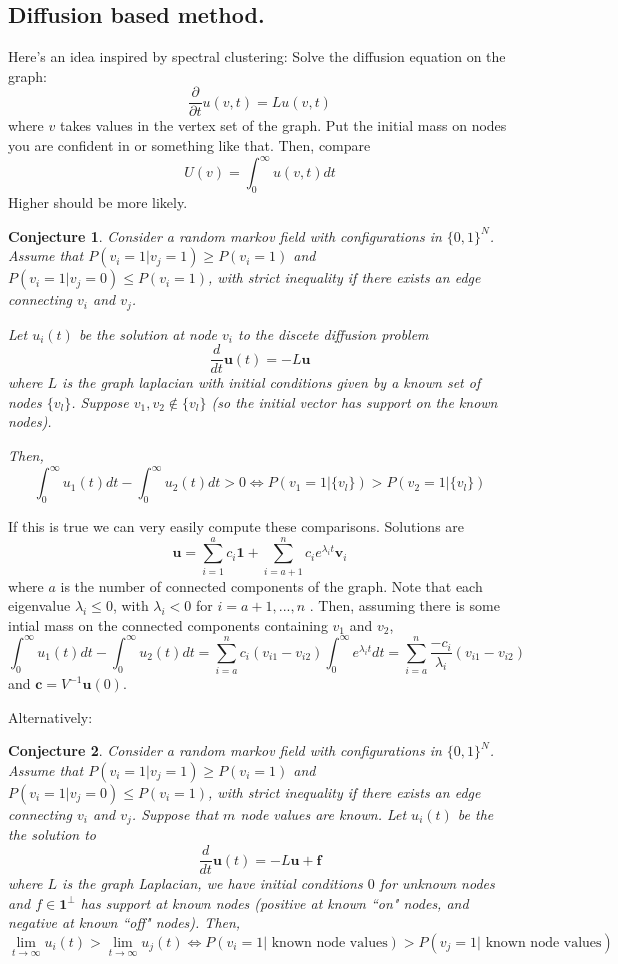 \documentclass[10pt]{article}
\newtheorem{conj}{Conjecture}
\theoremstyle{definition}
\numberwithin{theorem}{section}
\numberwithin{definition}{section}
\numberwithin{lemma}{section}
\numberwithin{corollary}{section}
\numberwithin{clm}{section}
\numberwithin{rmk}{section}
\renewcommand{\b}{\bm}
\begin{document}
\subsection{Diffusion based method.}
Here's an idea inspired by spectral clustering: Solve the diffusion equation on the graph:
\[
\frac{\partial}{\partial t} u(v,t) = L u(v,t)
\]
where $v$ takes values in the vertex set of the graph. Put the initial mass on nodes you are confident in or something like that. Then, compare
\[
U(v) = \int_{0}^{\infty} u(v,t) dt
\]
Higher should be more likely. 

\begin{conj}\label{initalCond}
Consider a random markov field with configurations in $\{0,1\}^N$. Assume that $P(v_i = 1|v_j = 1) \geq P(v_i = 1)$ and $P(v_i = 1|v_j = 0) \leq  P(v_i = 1)$, with strict inequality if there exists an edge connecting $v_i$ and $v_j$. 

Let $u_i(t)$ be the solution at node $v_i$ to the discete diffusion problem
\[
\frac{d}{dt}\b{u}(t)  = - L\b{u}
\]
where $L$ is the  graph laplacian with initial conditions given by a known set of nodes $\{v_l\}$. Suppose $v_1,v_2 \not\in \{v_l\}$ (so the initial vector has support on the known nodes).

Then, 
\[
\int_0^{\infty} u_1(t) dt - \int_0^{\infty} u_2(t) dt >  0 \Leftrightarrow  P(v_1=  1|\{v_l\}) > P(v_2 = 1|\{v_l\})
\]
\end{conj}

If this is true we can very easily compute these comparisons. Solutions are
\[
\b{u} = \sum_{i=1}^a c_i \b{1} + \sum_{i=a+1}^n c_i e^{\lambda_i t} \b{v}_i 
\]
where $a$ is the number of connected components of the graph. Note that each eigenvalue $\lambda_i \leq 0$, with $\lambda_i<0$ for $i = a+1,...,n$ \cite{vonLuxburg2007}. Then, assuming there is some intial mass on the connected components containing $v_1$ and $v_2$, 
\[
\int_0^{\infty} u_1(t) dt - \int_0^{\infty} u_2(t) dt =   \sum_{i=a}^n c_i  (v_{i1} - v_{i2}) \int_0^{\infty} e^{\lambda_i t} dt = \sum_{i=a}^n \frac{-c_i}{\lambda_i}  (v_{i1} - v_{i2}) 
\]
and $\b{c} = V^{-1}\b{u}(0)$. 


Alternatively:

\begin{conj}\label{forcing}
	Consider a random markov field with configurations in $\{0,1\}^N$. Assume that $P(v_i = 1|v_j = 1) \geq P(v_i = 1)$ and $P(v_i = 1|v_j = 0) \leq  P(v_i = 1)$, with strict inequality if there exists an edge connecting $v_i$ and $v_j$. Suppose that $m$ node values are known. Let $u_i(t)$ be the the solution to
	\[
	\frac{d}{dt}\b{u}(t) = -L\b{u} + \b{f}
	\]
	where $L$ is the graph Laplacian, we have initial conditions $0$ for unknown nodes and $f\in \b{1}^{\perp}$ has support at known nodes (positive at known ``on" nodes, and negative at known ``off" nodes). Then,
	\[
	\lim_{t\rightarrow \infty} u_i(t) >\lim_{t\rightarrow \infty} u_j(t) \Leftrightarrow P(v_i = 1|\text{ known node values}) > P(v_j = 1 | \text{ known node values})
	\]
\end{conj}
\end{document}
